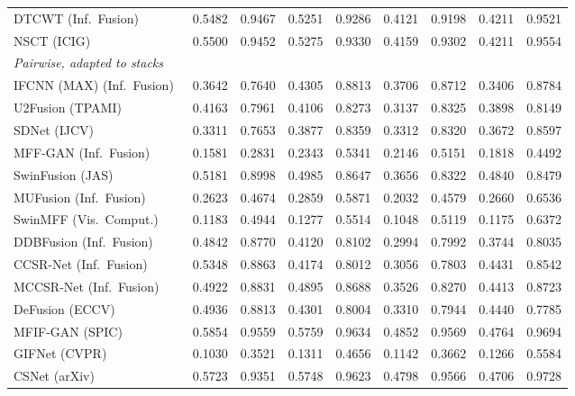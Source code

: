 \begin{table}[H]
{\begin{tabular}{lcccccccc}
DTCWT (Inf.\ Fusion)~\cite{lewis2007pixel} & 0.5482 & 0.9467 & 0.5251 & 0.9286 & 0.4121 & 0.9198 & 0.4211 & 0.9521 \\
NSCT (ICIG)~\cite{yang2007image} & 0.5500 & 0.9452 & 0.5275 & 0.9330 & 0.4159 & 0.9302 & 0.4211 & 0.9554 \\
\midrule
\multicolumn{9}{l}{\textit{Pairwise, adapted to stacks}} \\
IFCNN (MAX) (Inf.\ Fusion)~\cite{zhang2020ifcnn} & 0.3642 & 0.7640 & 0.4305 & 0.8813 & 0.3706 & 0.8712 & 0.3406 & 0.8784 \\
U2Fusion (TPAMI)~\cite{xu2020u2fusion} & 0.4163 & 0.7961 & 0.4106 & 0.8273 & 0.3137 & 0.8325 & 0.3898 & 0.8149 \\
SDNet (IJCV)~\cite{zhang2021sdnet} & 0.3311 & 0.7653 & 0.3877 & 0.8359 & 0.3312 & 0.8320 & 0.3672 & 0.8597 \\
MFF-GAN (Inf.\ Fusion)~\cite{zhang2021mff} & 0.1581 & 0.2831 & 0.2343 & 0.5341 & 0.2146 & 0.5151 & 0.1818 & 0.4492 \\
SwinFusion (JAS)~\cite{ma2022swinfusion} & 0.5181 & 0.8998 & 0.4985 & 0.8647 & 0.3656 & 0.8322 & 0.4840 & 0.8479 \\
MUFusion (Inf.\ Fusion)~\cite{cheng2023mufusion} & 0.2623 & 0.4674 & 0.2859 & 0.5871 & 0.2032 & 0.4579 & 0.2660 & 0.6536 \\
SwinMFF (Vis.\ Comput.)~\cite{xie2024swinmff} & 0.1183 & 0.4944 & 0.1277 & 0.5514 & 0.1048 & 0.5119 & 0.1175 & 0.6372 \\
DDBFusion (Inf.\ Fusion)~\cite{zhang2025ddbfusion} & 0.4842 & 0.8770 & 0.4120 & 0.8102 & 0.2994 & 0.7992 & 0.3744 & 0.8035 \\
CCSR-Net (Inf.\ Fusion)~\cite{ZHENG2025102974} & 0.5348 & 0.8863 & 0.4174 & 0.8012 & 0.3056 & 0.7803 & 0.4431 & 0.8542 \\
MCCSR-Net (Inf.\ Fusion)~\cite{ZHENG2025102974} & 0.4922 & 0.8831 & 0.4895 & 0.8688 & 0.3526 & 0.8270 & 0.4413 & 0.8723 \\
DeFusion (ECCV)~\cite{liang2022defusion} & 0.4936 & 0.8813 & 0.4301 & 0.8004 & 0.3310 & 0.7944 & 0.4440 & 0.7785 \\
MFIF-GAN (SPIC)~\cite{wang2021mfifgan} & 0.5854 & 0.9559 & 0.5759 & 0.9634 & 0.4852 & 0.9569 & 0.4764 & 0.9694 \\
GIFNet (CVPR)~\cite{cheng2025gifnet} & 0.1030 & 0.3521 & 0.1311 & 0.4656 & 0.1142 & 0.3662 & 0.1266 & 0.5584 \\
CSNet (arXiv)~\cite{csnet2026} & 0.5723 & 0.9351 & 0.5748 & 0.9623 & 0.4798 & 0.9566 & 0.4706 & 0.9728 \\

\end{tabular}}
\end{table}
